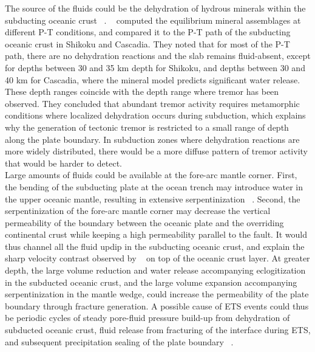 \documentclass[draft]{agujournal2019}
\begin{document}
The source of the fluids could be the dehydration of hydrous minerals within the subducting oceanic crust ~\cite{SHE_2006}. ~ computed the equilibrium mineral assemblages at different P-T conditions, and compared it to the P-T path of the subducting oceanic crust in Shikoku and Cascadia. They noted that for most of the P-T path, there are no dehydration reactions and the slab remains fluid-absent, except for depths between 30 and 35 km depth for Shikoku, and depths between 30 and 40 km for Cascadia, where the mineral model predicts significant water release. These depth ranges coincide with the depth range where tremor has been observed. They concluded that abundant tremor activity requires metamorphic conditions where localized dehydration occurs during subduction, which explains why the generation of tectonic tremor is restricted to a small range of depth along the plate boundary. In subduction zones where dehydration reactions are more widely distributed, there would be a more diffuse pattern of tremor activity that would be harder to detect. \\

Large amounts of fluids could be available at the fore-arc mantle corner. First, the bending of the subducting plate at the ocean trench may introduce water in the upper oceanic mantle, resulting in extensive serpentinization ~\cite{HYN_2015}. Second, the serpentinization of the fore-arc mantle corner may decrease the vertical permeability of the boundary between the oceanic plate and the overriding continental crust while keeping a high permeability parallel to the fault. It would thus channel all the fluid updip in the subducting oceanic crust, and explain the sharp velocity contrast observed by ~ on top of the oceanic crust layer. At greater depth, the large volume reduction and water release accompanying eclogitization in the subducted oceanic crust, and the large volume expansion accompanying serpentinization in the mantle wedge, could increase the permeability of the plate boundary through fracture generation. A possible cause of ETS events could thus be periodic cycles of steady pore-fluid pressure build-up from dehydration of subducted oceanic crust, fluid release from fracturing of the interface during ETS, and subsequent precipitation sealing of the plate boundary ~\cite{AUD_2009}. \\
\end{document}

